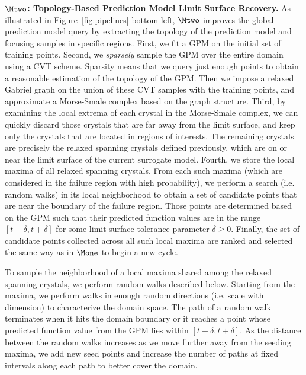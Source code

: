\noindent\textbf{$\Mtwo$: Topology-Based Prediction Model Limit Surface Recovery.}
As illustrated in Figure~\ref{fig:pipelines} bottom left, $\Mtwo$ improves the global prediction model query by extracting the topology of the prediction model and focusing samples in specific regions.
%
First, we fit a GPM on the initial set of training points.
%
Second, we \emph{sparsely} sample the GPM over the entire domain using a CVT scheme.
%
Sparsity means that we query just enough points to obtain a reasonable estimation of the topology of the GPM.
%
Then we impose a relaxed Gabriel graph on the union of these CVT samples with the training points, and approximate a Morse-Smale complex based on the graph structure.
%
Third, by examining the local extrema of each crystal in the Morse-Smale complex, we can quickly discard those crystals that are far away from the limit surface, and keep only the crystals that are located in regions of interests.
%
The remaining crystals are precisely the relaxed spanning crystals defined previously, which are on or near the limit surface of the current surrogate model.
%
Fourth, we store the local maxima of all relaxed spanning crystals.
%
From each such maxima (which are considered in the failure region with high probability), we perform a search (i.e. random walks) in its local neighborhood to obtain a set of candidate points that are near the boundary of the failure region.
%
Those points are determined based on the GPM such that their predicted function values are in the range $[t-\delta, t+\delta]$ for some limit surface tolerance parameter $\delta \geq 0$.
%
Finally, the set of candidate points collected across all such local maxima are ranked and selected the same way as in $\Mone$ to begin a new cycle.

To sample the neighborhood of a local maxima shared among the relaxed spanning crystals, we perform random walks described below.
%
Starting from the maxima, we perform walks in enough random directions (i.e. scale with dimension) to characterize the domain space.
%
The path of a random walk terminates when it hits the domain boundary or it reaches a point whose predicted function value from the GPM lies within $[t-\delta, t+\delta]$.
%
As the distance between the random walks increases as we move further away from the seeding maxima, we add new seed points and increase the number of paths at fixed intervals along each path to better cover the domain.

